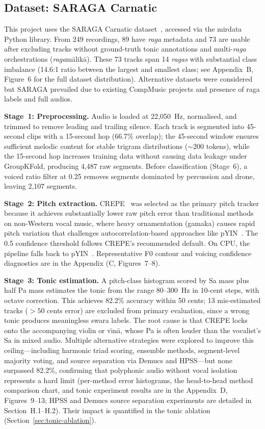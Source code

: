 \documentclass[11pt,a4paper]{article}
\begin{document}
{\subsection{Dataset: SARAGA Carnatic}

This project uses the SARAGA Carnatic dataset~\cite{srinivasamurthy2021}, accessed via the mirdata Python library. From 249 recordings, 89 have \textit{raga} metadata and 73 are usable after excluding tracks without ground-truth tonic annotations and multi-\textit{raga} orchestrations (\textit{raga}m\=alik\=a). These 73 tracks span 14 \textit{ragas} with substantial class imbalance (14.6:1 ratio between the largest and smallest class; see Appendix~B, Figure~6 for the full dataset distribution). Alternative datasets were considered but SARAGA prevailed due to existing CompMusic projects and presence of raga labels and full audios.

\textbf{Stage~1: Preprocessing.} Audio is loaded at 22,050~Hz, normalised, and trimmed to remove leading and trailing silence. Each track is segmented into 45-second clips with a 15-second hop (66.7\% overlap); the 45-second window ensures sufficient melodic content for stable trigram distributions (${\sim}200$ tokens), while the 15-second hop increases training data without causing data leakage under GroupKFold, producing 4,487 raw segments. Before classification (Stage~6), a voiced ratio filter at 0.25 removes segments dominated by percussion and drone, leaving 2,107 segments.

\textbf{Stage~2: Pitch extraction.} CREPE~\cite{kim2018} was selected as the primary pitch tracker because it achieves substantially lower raw pitch error than traditional methods on non-Western vocal music, where heavy ornamentation (gamaka) causes rapid pitch variation that challenges autocorrelation-based approaches like pYIN~\cite{mauch2014}. The 0.5 confidence threshold follows CREPE's recommended default. On CPU, the pipeline falls back to pYIN~\cite{mauch2014}. Representative F0 contour and voicing confidence diagnostics are in the Appendix (C, Figures~7--8).

\textbf{Stage~3: Tonic estimation.} A pitch-class histogram scored by Sa mass plus half Pa mass estimates the tonic from the range 80--300~Hz in 10-cent steps, with octave correction. This achieves 82.2\% accuracy within 50 cents; 13 mis-estimated tracks ($>50$ cents error) are excluded from primary evaluation, since a wrong tonic produces meaningless swara labels. The root cause is that CREPE locks onto the accompanying violin or v\=\i{}n\=a, whose Pa is often louder than the vocalist's Sa in mixed audio. Multiple alternative strategies were explored to improve this ceiling---including harmonic triad scoring, ensemble methods, segment-level majority voting, and source separation via Demucs and HPSS---but none surpassed 82.2\%, confirming that polyphonic audio without vocal isolation represents a hard limit (per-method error histograms, the head-to-head method comparison chart, and tonic experiment results are in the Appendix~D, Figures~9--13; HPSS and Demucs source separation experiments are detailed in Section~H.1--H.2). Their impact is quantified in the tonic ablation (Section~\ref{sec:tonic-ablation}).

}
\end{document}
